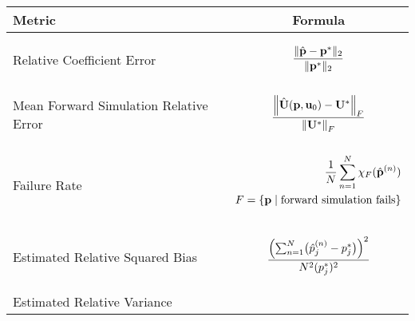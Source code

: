 \begin{table}
    \begin{tabular}{lr}
            \toprule 
		  \textbf{Metric} &  \multicolumn{1}{c}{\textbf{Formula}}\\
		\midrule 
		\\[-5pt]
		Relative Coefficient Error & \begin{minipage}{7cm}
			\begin{equation} \label{eq:cl2}
				\dfrac{\|\hat{\mathbf{p}} - \mathbf{p}^*\|_2}{\|\mathbf{p}^*\|_2}\\[5pt]
			\end{equation}
		\end{minipage} \\
		\hline 
		\\[-5pt]
		Mean Forward Simulation Relative Error & \begin{minipage}{7cm}
			\begin{equation} \label{eq:fsl2}
				\dfrac{ \left\| \hat{\mathbf{U}}(\mathbf{p}, \mathbf{u}_0) - \mathbf{U}^*\right\|_F}{ \left\| \mathbf{U}^*\right\|_F} \\[5pt]
			\end{equation}
		\end{minipage} \\
        \hline  
		\\[-20pt]
		Failure Rate & \begin{minipage}{7cm}
			\begin{equation} \label{eq:failRate}\begin{split}
					\frac{1}{N} \sum_{n=1}^N \chi_{F}(\hat{\mathbf{p}}^{(n)}) \\
					F = \{\mathbf{p} \mid \text{forward simulation fails}\} \\[5pt]
			\end{split}
			\end{equation}
		\end{minipage} \\
		\hline 
		\\[-5pt]
		Estimated Relative Squared Bias & \begin{minipage}{7cm}
			\begin{equation} \label{eq:estimBias}
				\frac{ \Bigl(\sum_{n=1}^N \bigl(\hat{p}_j^{(n)} - p^*_j\bigr)\Bigr)^2}{N^2(p^*_j)^2} \\[5pt]
			\end{equation}
		\end{minipage} \\
		\hline 
		\\[-5pt]
		Estimated Relative Variance & \begin{minipage}{7cm}

\end{minipage}
\end{tabular}
\end{table}
